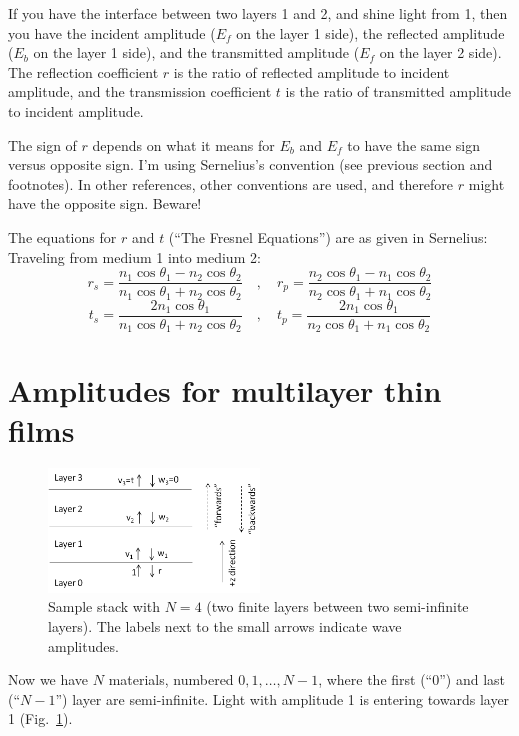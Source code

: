 \documentclass[12pt]{article}
\renewcommand{\(}{\left(}
\renewcommand{\)}{\right)}
\begin{document}
If you have the interface between two layers 1 and 2, and shine light from 1, then you have the incident amplitude ($E_f$ on the layer 1 side), the reflected amplitude ($E_b$ on the layer 1 side), and the transmitted amplitude ($E_f$ on the layer 2 side). The reflection coefficient $r$ is the ratio of reflected amplitude to incident amplitude, and the transmission coefficient $t$ is the ratio of transmitted amplitude to incident amplitude.

The sign of $r$ depends on what it means for $E_b$ and $E_f$ to have the same sign versus opposite sign. I'm using Sernelius's convention (see previous section and footnotes). In other references, other conventions are used, and therefore $r$ might have the opposite sign. Beware!

The equations for $r$ and $t$ (``The Fresnel Equations'') are as given in Sernelius: Traveling from medium 1 into medium 2:
$$r_s = \frac{n_1 \cos \theta_1 - n_2 \cos \theta_2}{n_1 \cos \theta_1 + n_2 \cos \theta_2} \quad , \quad r_p = \frac{n_2 \cos \theta_1 - n_1 \cos \theta_2}{n_2 \cos \theta_1 + n_1 \cos \theta_2}$$
$$ t_s = \frac{2n_1 \cos \theta_1}{n_1 \cos \theta_1 + n_2 \cos \theta_2} \quad , \quad t_p = \frac{2n_1 \cos \theta_1}{n_2 \cos \theta_1 + n_1 \cos \theta_2}$$


\section{Amplitudes for multilayer thin films}

\begin{figure}[htb]
\centering
\includegraphics[width=0.5\textwidth]{vwdefn.png}
\caption{Sample stack with $N=4$ (two finite layers between two semi-infinite layers). The labels next to the small arrows indicate wave amplitudes.\label{vwdefn}}
\end{figure}

Now we have $N$ materials, numbered $0,1,\ldots,N-1$, where the first (``0'') and last (``$N-1$'') layer are semi-infinite. Light with amplitude 1 is entering towards layer 1 (Fig.~\ref{vwdefn}).
\end{document}
